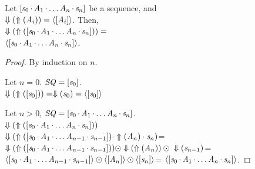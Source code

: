 \documentclass[acmsmall]{acmart}
\begin{document}



\begin{lemma}
  \label{lem:sequence-rx}
  Let $[\mathit{s}_0\mkern-1mu\cdot\mkern-1mu\mathit{A}_1\mkern-1mu\cdot\mkern-1mu
    \ldots\mathit{A}_n\mkern-1mu\cdot\mkern-1mu\mathit{s}_n]$ be a sequence,
  and\\
  $\Downarrow(\Uparrow(\mathit{A}_i))=\langle[\mathit{A}_i]\rangle$.
  Then,\\$\Downarrow(\Uparrow([\mathit{s}_0\mkern-1mu\cdot\mkern-1mu\mathit{A}_1\mkern-1mu\cdot\mkern-1mu
    \ldots\mathit{A}_n\mkern-1mu\cdot\mkern-1mu\mathit{s}_n]))=$\\
  $\langle[\mathit{s}_0\mkern-1mu\cdot\mkern-1mu\mathit{A}_1\mkern-1mu\cdot\mkern-1mu
      \ldots\mathit{A}_n\mkern-1mu\cdot\mkern-1mu\mathit{s}_n]\rangle$.
\end{lemma}
\begin{proof}
  By induction on $n$.

  Let $n=0$.
  $\mathit{SQ}=[\mathit{s}_0]$.\\
  $\Downarrow(\Uparrow([\mathit{s}_0]))=
  \Downarrow(\mathit{s}_0)=\langle[\mathit{s}_0]\rangle$

  Let $n>0$,
  $\mathit{SQ}=[\mathit{s}_0\mkern-1mu\cdot\mkern-1mu\mathit{A}_1\mkern-1mu\cdot\mkern-1mu
    \ldots\mathit{A}_n\mkern-1mu\cdot\mkern-1mu\mathit{s}_n]$.\\
  $\Downarrow(\Uparrow([\mathit{s}_0\mkern-1mu\cdot\mkern-1mu\mathit{A}_1\mkern-1mu\cdot\mkern-1mu
    \ldots\mathit{A}_n\mkern-1mu\cdot\mkern-1mu\mathit{s}_n]))$\\
  $\Downarrow(\Uparrow([\mathit{s}_0\mkern-1mu\cdot\mkern-1mu\mathit{A}_1\mkern-1mu\cdot\mkern-1mu
    \ldots\mathit{A}_{n-1}\mkern-1mu\cdot\mkern-1mu\mathit{s}_{n-1}])\cdot\Uparrow(\mathit{A}_n)
  \cdot\mathit{s}_n)$=\\
  $\Downarrow(\Uparrow([\mathit{s}_0\mkern-1mu\cdot\mkern-1mu\mathit{A}_1\mkern-1mu\cdot\mkern-1mu
    \ldots\mathit{A}_{n-1}\mkern-1mu\cdot\mkern-1mu\mathit{s}_{n-1}]))
  \odot
  \Downarrow(\Uparrow(\mathit{A}_n))
  \odot\\
  \Downarrow(\mathit{s}_{n-1})$=
  $\langle[\mathit{s}_0\mkern-1mu\cdot\mkern-1mu\mathit{A}_1\mkern-1mu\cdot\mkern-1mu
      \ldots\mathit{A}_{n-1}\mkern-1mu\cdot\mkern-1mu\mathit{s}_{n-1}]\rangle
  \odot\\
  \langle[\mathit{A}_n]\rangle
  \odot
  \langle[\mathit{s}_n]\rangle$=
  $\langle[\mathit{s}_0\mkern-1mu\cdot\mkern-1mu\mathit{A}_1\mkern-1mu\cdot\mkern-1mu
      \ldots\mathit{A}_n\mkern-1mu\cdot\mkern-1mu\mathit{s}_n]\rangle$.
\end{proof}
\end{document}
